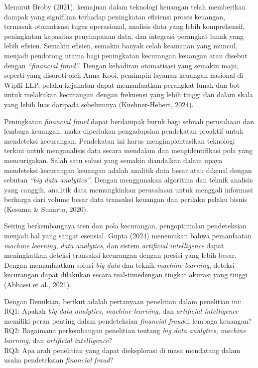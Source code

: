 \documentclass[12pt, a4paper]{article}
\begin{document}
Menurut Broby (2021), kemajuan dalam teknologi keuangan telah memberikan dampak yang signifikan terhadap peningkatan efisiensi proses keuangan, 
termasuk otomatisasi tugas operasional, analisis data yang lebih komprehensif, peningkatan kapasitas penyimpanan data, dan integrasi perangkat lunak 
yang lebih efisien. Semakin efisien, semakin banyak celah keamanan yang muncul, menjadi pendorong utama bagi peningkatan kecurangan keuangan 
atau disebut dengan \textit{“financial fraud”}. Dengan kehadiran otomatisasi yang semakin maju, seperti yang disoroti oleh Anna Kooi, pemimpin layanan keuangan nasional di Wipfli LLP, 
pelaku kejahatan dapat memanfaatkan perangkat lunak dan bot untuk melakukan kecurangan dengan frekuensi yang lebih tinggi dan dalam skala yang lebih luas daripada sebelumnya (Kuehner-Hebert, 2024).

Peningkatan \textit{financial fraud} dapat berdampak buruk bagi sebuah perusahaan dan lembaga keuangan, maka diperlukan pengadopsian pendekatan proaktif untuk mendeteksi kecurangan. 
Pendekatan ini harus mengimplentasikan teknologi terkini untuk menganalisis data secara mendalam dan mengidentifikasi pola yang mencurigakan. 
Salah satu solusi yang semakin diandalkan dalam upaya mendeteksi kecurangan keuangan adalah analitik data besar atau dikenal dengan sebutan \textit{“big data analytics”}. 
Dengan menggunakan algoritma dan teknik analisis yang canggih, analitik data memungkinkan perusahaan untuk menggali informasi berharga dari volume besar 
data transaksi keuangan dan perilaku pelaku bisnis (Kesuma \& Sunarto, 2020).

Seiring berkembangnya tren dan pola kecurangan, pengoptimalan pendeteksian menjadi hal yang sangat esensial.
Gupta  (2024) menemukan  bahwa pemanfaatan \textit{machine learning}, \textit{data analytics}, dan sistem \textit{artificial intelligence} dapat meningkatkan deteksi transaksi kecurangan dengan presisi yang lebih besar. 
Dengan memanfaatkan solusi \textit{big data} dan teknik \textit{machine learning}, deteksi kecurangan dapat  dilakukan  secara real-timedengan  tingkat  akurasi  yang  tinggi (Abbassi  et  al., 2021).

Dengan Demikian, berikut adalah pertanyaan penelitian dalam penelitian ini:\\
RQ1: Apakah \textit{big data analytics, machine learning,} dan \textit{artificial intelligence} memiliki peran penting dalam pendeteksian \textit{financial fraud}di lembaga keuangan?\\
RQ2: Bagaimana  perkembangan  penelitian  tentang \textit{big data analytics, machine learning,} dan \textit{artificial intelligence}?\\
RQ3: Apa arah penelitian  yang  dapat  dieksplorasi  di  masa  mendatang  dalam  usaha  pendeteksian \textit{financial fraud}?
\end{document}
